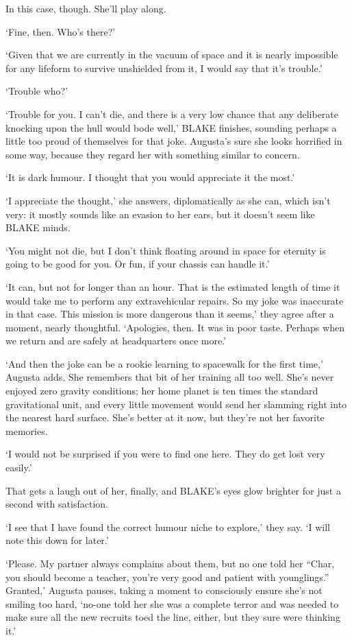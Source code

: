 In this case, though. She'll play along.

`Fine, then. Who's there?'

`Given that we are currently in the vacuum of space and it is nearly
impossible for any lifeform to survive unshielded from it, I would say
that it's trouble.'

`Trouble \textellipsis who?'

`Trouble for you. I can't die, and there is a very low chance that any
deliberate knocking upon the hull would bode well,' BLAKE finishes,
sounding perhaps a little too proud of themselves for that
joke. Augusta's sure she looks horrified in some way, because they
regard her with something similar to concern.

`It is dark humour. I thought that you would appreciate it the
most.'

`I appreciate the thought,' she answers, diplomatically as she
can, which isn't very: it mostly sounds like an evasion to her ears,
but it doesn't seem like BLAKE minds.

`You might not die, but I don't think floating around in space for
eternity is going to be good for you. Or fun, if your chassis can
handle it.'

`It can, but not for longer than an hour. That is the estimated length
of time it would take me to perform any extravehicular repairs. So my
joke was inaccurate in that case. This mission is more dangerous than
it seems,' they agree after a moment, nearly thoughtful. `Apologies,
then. It was in poor taste. Perhaps when we return and are safely at
headquarters once more.'

`And then the joke can be a rookie learning to spacewalk for the first
time,' Augusta adds. She remembers that bit of her training all too
well. She's never enjoyed zero gravity conditions; her home planet is
ten times the standard gravitational unit, and every little movement
would send her slamming right into the nearest hard surface. She's
better at it now, but they're not her favorite memories.

`I would not be surprised if you were to find one here. They do get
lost very easily.'

That gets a laugh out of her, finally, and BLAKE's eyes glow brighter
for just a second with satisfaction.

`I see that I have found the correct humour niche to explore,' they
say. `I will note this down for later.'

`Please. My partner always complains about them, but no one told her
``Char, you should become a teacher, you're very good and patient with
younglings.'' Granted,' Augusta pauses, taking a moment to consciously
ensure she's not smiling too hard, `no-one told her she was a complete
terror and was needed to make sure all the new recruits toed the line,
either, but they sure were thinking it.'

